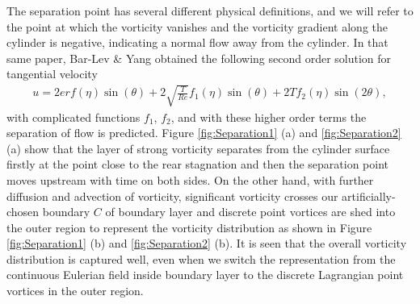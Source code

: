 The separation point has several different physical definitions, and we will refer to the point at which the vorticity vanishes and the vorticity gradient along the cylinder is negative, indicating a normal flow away from the cylinder.
In that same paper, Bar-Lev \& Yang \cite{bar1975initial} obtained the following second order solution for tangential velocity
\begin{align} \label{eqn:BarLevYang2}
u =  2 erf(\eta) \sin(\theta) + 2 \sqrt{\frac{T}{Re}} f_1(\eta) \sin(\theta) + 2T f_2(\eta) \sin(2\theta),
\end{align}
with complicated functions $f_1$, $f_2$, and with these higher order terms the separation of flow is predicted.
Figure \ref{fig:Separation1} (a) and \ref{fig:Separation2} (a) show that the layer of strong vorticity separates from the cylinder surface firstly at the point close to the rear stagnation and then the separation point moves upstream with time on both sides.
On the other hand, with further diffusion and advection of vorticity, significant vorticity crosses our artificially-chosen boundary $C$ of boundary layer and discrete point vortices are shed into the outer region to represent the vorticity distribution as shown in Figure \ref{fig:Separation1} (b) and \ref{fig:Separation2} (b).
It is seen that the overall vorticity distribution is captured well, even when we switch the representation from the continuous Eulerian field inside boundary layer to the discrete Lagrangian point vortices in the outer region.

